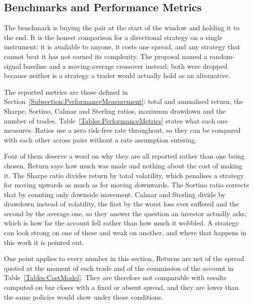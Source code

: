 \subsection{Benchmarks and Performance Metrics}

The benchmark is buying the pair at the start of the window and holding it to the end. It is the honest comparison for a directional strategy on a single instrument: it is available to anyone, it costs one spread, and any strategy that cannot beat it has not earned its complexity. The proposal named a random-signal baseline and a moving-average crossover instead; both were dropped because neither is a strategy a trader would actually hold as an alternative.

The reported metrics are those defined in Section~\ref{Subsection:PerformanceMeasurement}: total and annualised return, the Sharpe, Sortino, Calmar and Sterling ratios, maximum drawdown and the number of trades. Table~\ref{Tables:PerformanceMetrics} states what each one measures. Ratios use a zero risk-free rate throughout, so they can be compared with each other across pairs without a rate assumption entering.



Four of them deserve a word on why they are all reported rather than one being chosen. Return says how much was made and nothing about the cost of making it. The Sharpe ratio divides return by total volatility, which penalises a strategy for moving upwards as much as for moving downwards. The Sortino ratio corrects that by counting only downside movement. Calmar and Sterling divide by drawdown instead of volatility, the first by the worst loss ever suffered and the second by the average one, so they answer the question an investor actually asks, which is how far the account fell rather than how much it wobbled. A strategy can look strong on one of these and weak on another, and where that happens in this work it is pointed out.

One point applies to every number in this section. Returns are net of the spread quoted at the moment of each trade and of the commission of the account in Table~\ref{Tables:CostModel}. They are therefore not comparable with results computed on bar closes with a fixed or absent spread, and they are lower than the same policies would show under those conditions.